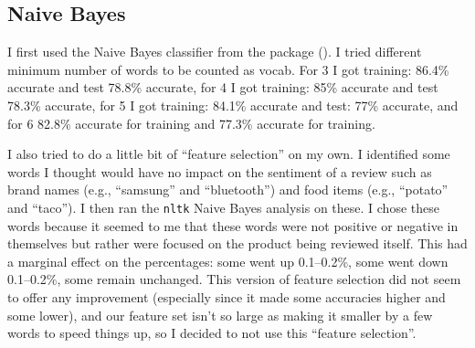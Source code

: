 \subsection{Naive Bayes}
I first used the Naive Bayes classifier from the  package (\citealt{bird2009}).  I tried different minimum number of words to be counted as vocab.  For 3 I got training: 86.4\% accurate and test 78.8\% accurate, for 4 I got training: 85\% accurate and test 78.3\% accurate, for 5 I got training: 84.1\% accurate and test: 77\% accurate, and for 6 82.8\% accurate for training and 77.3\% accurate for training.

I also tried to do a little bit of ``feature selection'' on my own.  I identified some words I thought would have no impact on the sentiment of a review such as brand names (e.g., ``samsung'' and ``bluetooth'') and food items (e.g., ``potato'' and ``taco'').  I then ran the \texttt{nltk} Naive Bayes analysis on these.  I chose these words because it seemed to me that these words were not positive or negative in themselves but rather were focused on the product being reviewed itself.  This had a marginal effect on the percentages: some went up 0.1--0.2\%, some went down 0.1--0.2\%, some remain unchanged.  This version of feature selection did not seem to offer any improvement (especially since it made some accuracies higher and some lower), and our feature set isn't so large as making it smaller by a few words to speed things up, so I decided to not use this ``feature selection''.